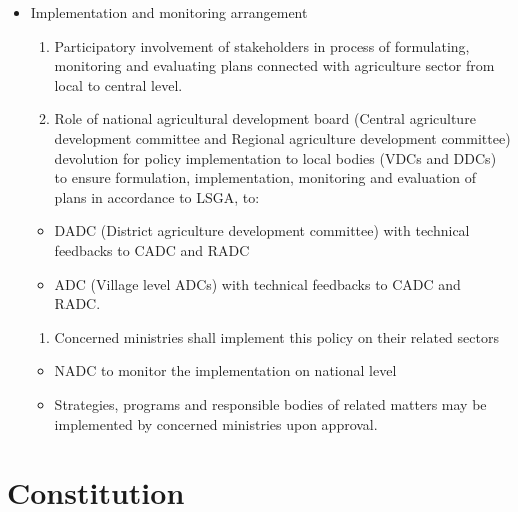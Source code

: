 \documentclass[
]{book}
\providecommand{\tightlist}{%
  \setlength{\itemsep}{0pt}\setlength{\parskip}{0pt}}
\begin{document}
\begin{itemize}
\tightlist
\item
  Implementation and monitoring arrangement

  \begin{enumerate}
  \def\labelenumi{\arabic{enumi}.}
  \tightlist
  \item
    Participatory involvement of stakeholders in process of formulating, monitoring and evaluating plans connected with agriculture sector from local to central level.
  \item
    Role of national agricultural development board (Central agriculture development committee and Regional agriculture development committee) devolution for policy implementation to local bodies (VDCs and DDCs) to ensure formulation, implementation, monitoring and evaluation of plans in accordance to LSGA, to:
  \end{enumerate}

  \begin{itemize}
  \tightlist
  \item
    DADC (District agriculture development committee) with technical feedbacks to CADC and RADC
  \item
    ADC (Village level ADCs) with technical feedbacks to CADC and RADC.
  \end{itemize}

  \begin{enumerate}
  \def\labelenumi{\arabic{enumi}.}
  \setcounter{enumi}{2}
  \tightlist
  \item
    Concerned ministries shall implement this policy on their related sectors
  \end{enumerate}

  \begin{itemize}
  \tightlist
  \item
    NADC to monitor the implementation on national level
  \item
    Strategies, programs and responsible bodies of related matters may be implemented by concerned ministries upon approval.
  \end{itemize}
\end{itemize}

\hypertarget{constitution}{%
\chapter{Constitution}\label{constitution}}
\end{document}
